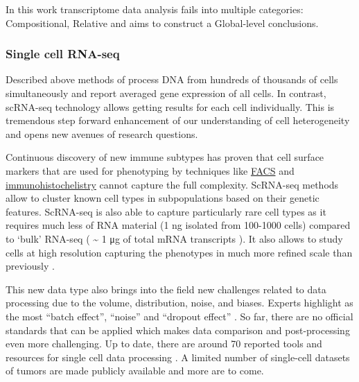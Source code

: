 \documentclass[12pt,]{book}
\theoremstyle{definition}
\theoremstyle{definition}
\theoremstyle{definition}
\theoremstyle{remark}
\begin{document}
In this work transcriptome data analysis fails into multiple categories:
Compositional, Relative and aims to construct a Global-level
conclusions.

\hypertarget{single-cell-rna-seq}{%
\subsubsection{Single cell RNA-seq}\label{single-cell-rna-seq}}

Described above methods of process DNA from hundreds of thousands of
cells simultaneously and report averaged gene expression of all cells.
In contrast, scRNA-seq technology allows getting results for each cell
individually. This is tremendous step forward enhancement of our
understanding of cell heterogeneity and opens new avenues of research
questions.

Continuous discovery of new immune subtypes has proven that cell surface
markers that are used for phenotyping by techniques like
\protect\hyperlink{facs}{FACS} and
\protect\hyperlink{staining}{immunohistochelistry} cannot capture the
full complexity. ScRNA-seq methods allow to cluster known cell types in
subpopulations based on their genetic features. ScRNA-seq is also able
to capture particularly rare cell types as it requires much less of RNA
material (1 ng isolated from 100-1000 cells) compared to `bulk' RNA-seq
( \textasciitilde{} 1 μg of total mRNA transcripts ). It also allows to
study cells at high resolution capturing the phenotypes in much more
refined scale than previously \citep{Papalexi2017}.

This new data type also brings into the field new challenges related to
data processing due to the volume, distribution, noise, and biases.
Experts highlight as the most ``batch effect'', ``noise'' and ``dropout
effect'' \citep{Perkel2017}. So far, there are no official standards
that can be applied which makes data comparison and post-processing even
more challenging. Up to date, there are around 70 reported tools and
resources for single cell data processing \citep{Davis2016} . A limited
number of single-cell datasets of tumors are made publicly available and
more are to come.
\end{document}
